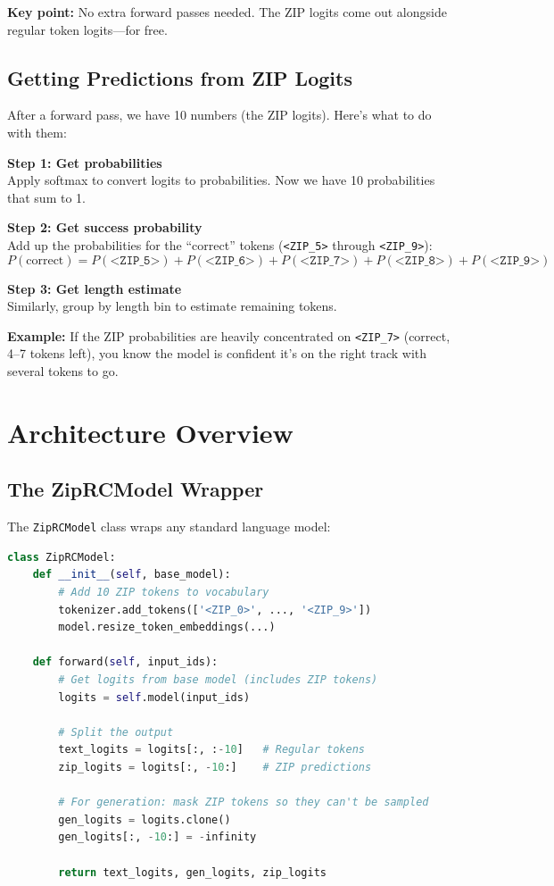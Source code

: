 \documentclass[11pt,a4paper]{article}
\newcommand{\ziptoken}[1]{\texttt{<ZIP\_#1>}}
\begin{document}
\textbf{Key point:} No extra forward passes needed. The ZIP logits come out alongside regular token logits---for free.

\subsection{Getting Predictions from ZIP Logits}

After a forward pass, we have 10 numbers (the ZIP logits). Here's what to do with them:

\textbf{Step 1: Get probabilities}\\
Apply softmax to convert logits to probabilities. Now we have 10 probabilities that sum to 1.

\textbf{Step 2: Get success probability}\\
Add up the probabilities for the ``correct'' tokens (\ziptoken{5} through \ziptoken{9}):
\[
P(\text{correct}) = P(\ziptoken{5}) + P(\ziptoken{6}) + P(\ziptoken{7}) + P(\ziptoken{8}) + P(\ziptoken{9})
\]

\textbf{Step 3: Get length estimate}\\
Similarly, group by length bin to estimate remaining tokens.

\textbf{Example:} If the ZIP probabilities are heavily concentrated on \ziptoken{7} (correct, 4--7 tokens left), you know the model is confident it's on the right track with several tokens to go.

\section{Architecture Overview}

\subsection{The ZipRCModel Wrapper}

The \texttt{ZipRCModel} class wraps any standard language model:

\begin{lstlisting}[language=Python]
class ZipRCModel:
    def __init__(self, base_model):
        # Add 10 ZIP tokens to vocabulary
        tokenizer.add_tokens(['<ZIP_0>', ..., '<ZIP_9>'])
        model.resize_token_embeddings(...)

    def forward(self, input_ids):
        # Get logits from base model (includes ZIP tokens)
        logits = self.model(input_ids)

        # Split the output
        text_logits = logits[:, :-10]   # Regular tokens
        zip_logits = logits[:, -10:]    # ZIP predictions

        # For generation: mask ZIP tokens so they can't be sampled
        gen_logits = logits.clone()
        gen_logits[:, -10:] = -infinity

        return text_logits, gen_logits, zip_logits
\end{lstlisting}
\end{document}
